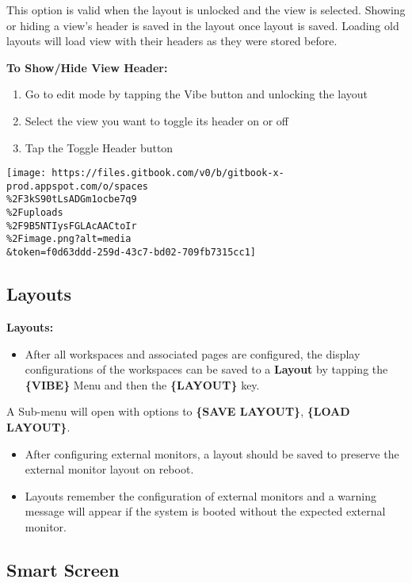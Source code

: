 \documentclass[
]{article}
\providecommand{\tightlist}{%
  \setlength{\itemsep}{0pt}\setlength{\parskip}{0pt}}
\begin{document}
This option is valid when the layout is unlocked and the view is selected. Showing or hiding a view's header is saved in the layout once layout is saved. Loading old layouts will load view with their headers as they were stored before.

\textbf{To Show/Hide View Header:}

\begin{enumerate}
\def\labelenumi{\arabic{enumi}.}
\item
  Go to edit mode by tapping the Vibe button and unlocking the layout
\item
  Select the view you want to toggle its header on or off
\item
  Tap the Toggle Header button
\end{enumerate}

\texttt{[image: https://files.gitbook.com/v0/b/gitbook-x-prod.appspot.com/o/spaces\\\%2F3kS90tLsADGm1ocbe7q9\\\%2Fuploads\\\%2F9B5NTIysFGLAcAACtoIr\\\%2Fimage.png?alt=media\\\&token=f0d63ddd-259d-43c7-bd02-709fb7315cc1]}

\hypertarget{layouts}{%
\subsection{Layouts}\label{layouts}}

\textbf{Layouts:}

\begin{itemize}
\tightlist
\item
  After all workspaces and associated pages are configured, the display configurations of the workspaces can be saved to a \textbf{Layout} by tapping the \textbf{\{VIBE\}} Menu and then the \textbf{\{LAYOUT\}} key.
\end{itemize}

A Sub-menu will open with options to \textbf{\{SAVE LAYOUT\}}, \textbf{\{LOAD LAYOUT\}}.

\begin{itemize}
\item
  After configuring external monitors, a layout should be saved to preserve the external monitor layout on reboot.
\item
  Layouts remember the configuration of external monitors and a warning message will appear if the system is booted without the expected external monitor.
\end{itemize}

\hypertarget{smart-screen}{%
\subsection{Smart Screen}\label{smart-screen}}
\end{document}
